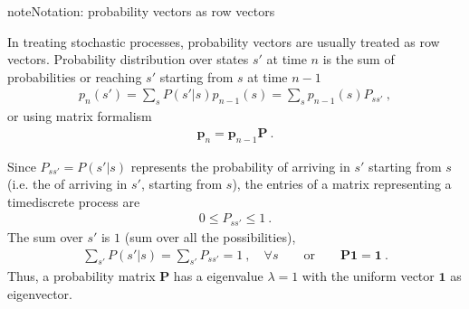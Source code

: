 \documentclass[letterpaper,10pt,english]{jupyterBook}
\begin{document}
\sphinxAtStartPar
{}

\begin{sphinxadmonition}{note}{Notation: probability vectors as row vectors}

\sphinxAtStartPar
In treating stochastic processes, probability vectors are usually treated as row vectors. Probability distribution over states \(s'\) at time \(n\) is the sum of probabilities or reaching \(s'\) starting from \(s\) at time \(n-1\)
\begin{equation*}
\begin{split}p_n(s') = \sum_s P(s'|s) p_{n-1}(s) = \sum_s p_{n-1}(s) P_{s s'} \ ,\end{split}
\end{equation*}
\sphinxAtStartPar
or using matrix formalism
\begin{equation*}
\begin{split}\mathbf{p}_n = \mathbf{p}_{n-1} \mathbf{P} \ .\end{split}
\end{equation*}\end{sphinxadmonition}

\sphinxAtStartPar
{}

\sphinxAtStartPar
Since \(P_{s s'} = P(s'|s)\) represents the probability of arriving in \(s'\) starting from \(s\) (i.e. the  of arriving in \(s'\), starting from \(s\)), the entries of a matrix representing a time\sphinxhyphen{}discrete process are
\begin{equation*}
\begin{split}0 \le P_{s s'} \le 1 \ .\end{split}
\end{equation*}
\sphinxAtStartPar
The sum over \(s'\) is \(1\) (sum over all the possibilities),
\begin{equation*}
\begin{split}\sum_{s'} P(s' | s) = \sum_{s'} P_{s s'} = 1 \ , \quad \forall s \qquad \text{or} \qquad \mathbf{P} \mathbf{1} = \mathbf{1} \ .\end{split}
\end{equation*}
\sphinxAtStartPar
Thus, a probability matrix \(\mathbf{P}\) has a eigenvalue \(\lambda = 1\) with the uniform vector \(\mathbf{1}\) as eigenvector.

\sphinxAtStartPar
{} 
\end{document}
